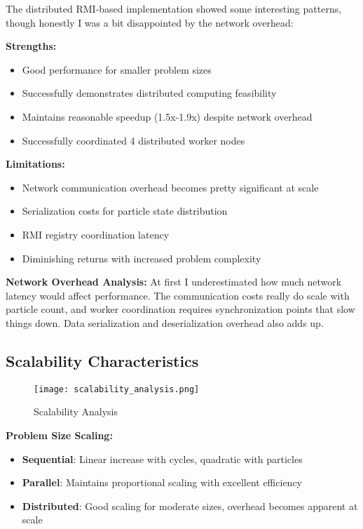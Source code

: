 \documentclass[12pt,a4paper]{article}
\begin{document}
The distributed RMI-based implementation showed some interesting patterns, though honestly I was a bit disappointed by the network overhead:

\textbf{Strengths:}
\begin{itemize}
    \item Good performance for smaller problem sizes
    \item Successfully demonstrates distributed computing feasibility
    \item Maintains reasonable speedup (1.5x-1.9x) despite network overhead
    \item Successfully coordinated 4 distributed worker nodes
\end{itemize}

\textbf{Limitations:}
\begin{itemize}
    \item Network communication overhead becomes pretty significant at scale
    \item Serialization costs for particle state distribution
    \item RMI registry coordination latency
    \item Diminishing returns with increased problem complexity
\end{itemize}

\textbf{Network Overhead Analysis:}
At first I underestimated how much network latency would affect performance. The communication costs really do scale with particle count, and worker coordination requires synchronization points that slow things down. Data serialization and deserialization overhead also adds up.

\subsection{Scalability Characteristics}

\begin{figure}[H]
\centering
\texttt{[image: scalability\_analysis.png]}
\caption{Scalability Analysis}
\label{fig:scalability}
\end{figure}

\textbf{Problem Size Scaling:}
\begin{itemize}
    \item \textbf{Sequential}: Linear increase with cycles, quadratic with particles
    \item \textbf{Parallel}: Maintains proportional scaling with excellent efficiency
    \item \textbf{Distributed}: Good scaling for moderate sizes, overhead becomes apparent at scale
\end{itemize}
\end{document}
